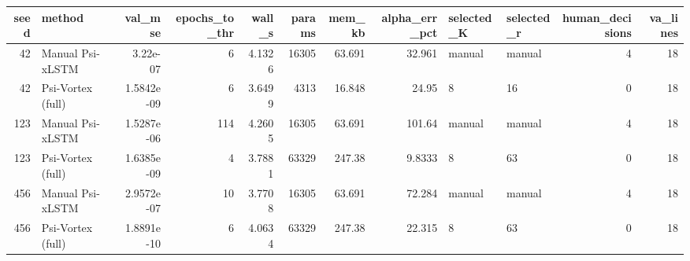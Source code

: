 \begin{tabular}{rlrrrrrrllrr}
\toprule
seed & method & val_mse & epochs_to_thr & wall_s & params & mem_kb & alpha_err_pct & selected_K & selected_r & human_decisions & va_lines \\
\midrule
42 & Manual Psi-xLSTM & 3.22e-07 & 6 & 4.1326 & 16305 & 63.691 & 32.961 & manual & manual & 4 & 18 \\
42 & Psi-Vortex (full) & 1.5842e-09 & 6 & 3.6499 & 4313 & 16.848 & 24.95 & 8 & 16 & 0 & 18 \\
123 & Manual Psi-xLSTM & 1.5287e-06 & 114 & 4.2605 & 16305 & 63.691 & 101.64 & manual & manual & 4 & 18 \\
123 & Psi-Vortex (full) & 1.6385e-09 & 4 & 3.7881 & 63329 & 247.38 & 9.8333 & 8 & 63 & 0 & 18 \\
456 & Manual Psi-xLSTM & 2.9572e-07 & 10 & 3.7708 & 16305 & 63.691 & 72.284 & manual & manual & 4 & 18 \\
456 & Psi-Vortex (full) & 1.8891e-10 & 6 & 4.0634 & 63329 & 247.38 & 22.315 & 8 & 63 & 0 & 18 \\
\bottomrule
\end{tabular}
